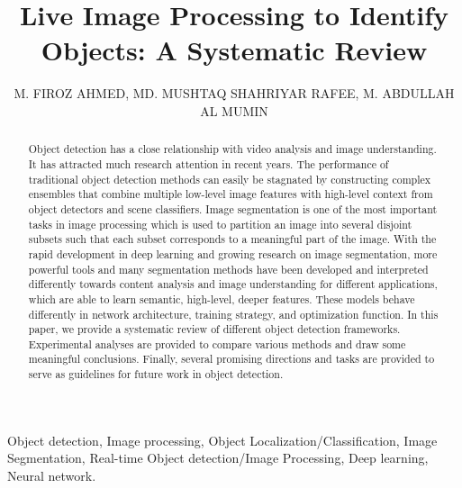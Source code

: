 \documentclass[two column]{ieeeaccess}
\begin{document}

\title{Live Image Processing to Identify Objects: A Systematic Review}
\author{\uppercase{M. Firoz Ahmed}, \uppercase{Md. Mushtaq Shahriyar Rafee}, \uppercase{M. Abdullah Al Mumin}}

\address{Department of Computer Science and Engineering, Shahjalal University of Science and Technology, Sylhet}




\begin{abstract}
Object detection has a close relationship with video analysis and image understanding. It has attracted much research attention in recent years. The performance of traditional object detection methods can easily be stagnated by constructing complex ensembles that combine multiple low-level image features with high-level context from object detectors and scene classifiers. Image segmentation is one of the most important tasks in image processing which is used to partition an image into several disjoint subsets such that each subset corresponds to a meaningful part of the image. With the rapid development in deep learning and growing research on image segmentation, more powerful tools and many segmentation methods have been developed and interpreted differently towards content analysis and image understanding for different applications, which are able to learn semantic, high-level, deeper features. These models behave differently in network architecture, training strategy, and optimization function. In this paper, we provide a systematic review of different object detection frameworks. Experimental analyses are provided to compare various methods and draw some meaningful conclusions. Finally, several promising directions and tasks are provided to serve as guidelines for future work in object detection.
\end{abstract}

\begin{keywords}
Object detection, Image processing, Object Localization/Classification, Image Segmentation, Real-time Object detection/Image Processing, Deep learning, Neural network.
\end{keywords}
\end{document}
